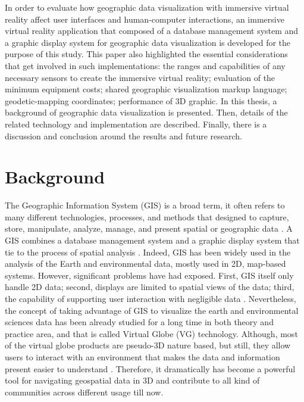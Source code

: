 In order to evaluate how geographic data visualization with immersive virtual reality affect user interfaces and human-computer interactions, an immersive virtual reality application that composed of a database management system and a graphic display system for geographic data visualization is developed for the purpose of this study. This paper also highlighted the essential considerations that get involved in such implementations: the ranges and capabilities of any necessary sensors to create the immersive virtual reality; evaluation of the minimum equipment costs; shared geographic visualization markup language; geodetic-mapping coordinates; performance of 3D graphic. In this thesis, a background of geographic data visualization is presented. Then, details of the related technology and implementation are described. Finally, there is a discussion and conclusion around the results and future research.

\section{Background}
\label{section:background}

The Geographic Information System (GIS) is a broad term, it often refers to many different technologies, processes, and methods that designed to capture, store, manipulate, analyze, manage, and present spatial or geographic data \cite{wiki.gis.2016}. A GIS combines a database management system and a graphic display system that tie to the process of spatial analysis \cite{rhyne.virtual.1997}. Indeed, GIS has been widely used in the analysis of the Earth and environmental data, mostly used in 2D, map-based systems. However, significant problems have had exposed. First, GIS itself only handle 2D data; second, displays are limited to spatial views of the data; third, the capability of supporting user interaction with negligible data \cite{rhyne.visualization-gis.1994}. Nevertheless, the concept of taking advantage of GIS to visualize the earth and environmental sciences data has been already studied for a long time in both theory and practice area, and that is called Virtual Globe (VG) technology. Although, most of the virtual globe products are pseudo-3D nature based, but still, they allow users to interact with an environment that makes the data and information present easier to understand \cite{tuttle.virtual-globes.2008}. Therefore, it dramatically has become a powerful tool for navigating geospatial data in 3D and contribute to all kind of communities across different usage till now. 

